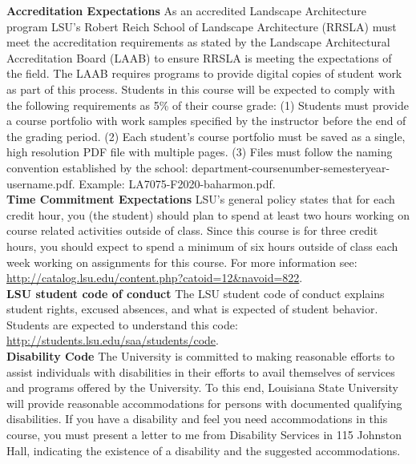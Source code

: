 \documentclass[11pt,article,oneside]{memoir}
\begin{document}
\noindent \textbf{Accreditation Expectations}
As an accredited Landscape Architecture program
LSU's Robert Reich School of Landscape Architecture (RRSLA) 
must meet the accreditation requirements 
as stated by the Landscape Architectural Accreditation
Board (LAAB) to ensure RRSLA is meeting the expectations of the field. 
The LAAB requires programs to provide digital copies 
of student work as part of this process.
Students in this course will be expected 
to comply with the following requirements
as 5\% of their course grade: 
(1) Students must provide a course portfolio
with work samples specified by the instructor 
before the end of the grading period. 
(2) Each student's course portfolio must be saved as 
a single, high resolution PDF file with multiple pages. 
(3) Files must follow the naming convention
established by the school: department-coursenumber-semesteryear-username.pdf.
Example: LA7075-F2020-baharmon.pdf.\\

\noindent \textbf{Time Commitment Expectations}
LSU's general policy states that for each credit hour, you (the student) should plan to
spend at least two hours working on course related activities outside of class. Since this course is for three credit hours, you should expect to spend a minimum of six hours outside of class each week working on assignments for this course. For more information see: 
\url{http://catalog.lsu.edu/content.php?catoid=12&navoid=822}.\\

\noindent \textbf{LSU student code of conduct}
The LSU student code of conduct explains student rights, excused absences, and what is expected of student behavior. Students are expected to understand this code:  \url{http://students.lsu.edu/saa/students/code}.\\ %

\noindent \textbf{Disability Code}
The University is committed to making reasonable efforts to assist individuals with disabilities in
their efforts to avail themselves of services and programs offered by the University. To this end,
Louisiana State University will provide reasonable accommodations for persons with
documented qualifying disabilities. If you have a disability and feel you need accommodations in
this course, you must present a letter to me from Disability Services in 115 Johnston Hall,
indicating the existence of a disability and the suggested accommodations.\\
\end{document}
